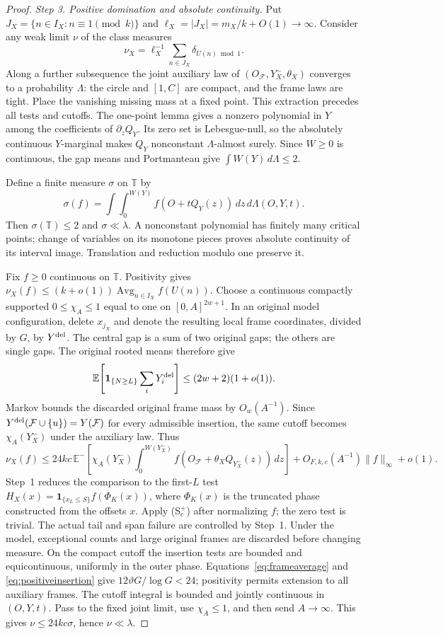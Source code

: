 \documentclass[11pt,a4paper]{article}
\newcommand{\E}{\mathbb E}
\newcommand{\ind}{\mathbf 1}
\DeclareMathOperator{\Avg}{Avg}
\begin{document}
\begin{proof}
\smallskip\noindent\emph{Step 3. Positive domination and absolute continuity.}
Put $J_X=\{n\in I_X:n\equiv1\pmod k\}$ and
$\ell_X=|J_X|=m_X/k+O(1)\to\infty$.
Consider any weak limit $\nu$ of the class measures
\[
                  \nu_X=\ell_X^{-1}\sum_{n\in J_X}\delta_{U(n)\bmod1}.
\]
Along a further subsequence the joint auxiliary law of
$(O_{\mathcal F},Y_X^-,\theta_X)$ converges to a probability $\Lambda$:
the circle and $[1,C]$ are compact, and the frame laws are tight.
Place the vanishing missing mass at a fixed point.
This extraction precedes all tests and cutoffs.
The one-point lemma gives a nonzero polynomial in $Y$ among the
coefficients of $\partial_zQ_Y$. Its zero set is Lebesgue-null, so the
absolutely continuous $Y$-marginal makes $Q_Y$ nonconstant
$\Lambda$-almost surely. Since $W\ge0$ is continuous, the gap means
and Portmanteau give $\int W(Y)\,d\Lambda\le2$.

Define a finite measure $\sigma$ on $\mathbb T$ by
\[
 \sigma(f)=\int\!\int_0^{W(Y)}
                 f(O+tQ_Y(z))\,dz\,d\Lambda(O,Y,t).
\]
Then $\sigma(\mathbb T)\le2$ and $\sigma\ll\lambda$.
A nonconstant polynomial has finitely many critical points;
change of variables on its monotone pieces proves absolute continuity
of its interval image. Translation and reduction modulo one preserve it.

Fix $f\ge0$ continuous on $\mathbb T$. Positivity gives
$\nu_X(f)\le(k+o(1))\Avg_{n\in I_X}f(U(n))$.
Choose a continuous compactly supported $0\le\chi_A\le1$ equal to one
on $[0,A]^{2w+1}$. In an original model configuration, delete $x_{j_X}$
and denote the resulting local frame coordinates, divided by $G$, by $Y^{\rm del}$.
The central gap is a sum of two original gaps; the others are single gaps.
The original rooted means therefore give
\[
 \E\!\left[\ind_{\{N\ge L\}}\sum_iY_i^{\rm del}\right]
                          \le(2w+2)(1+o(1)).
\]
Markov bounds the discarded original frame mass by $O_w(A^{-1})$.
Since $Y^{\rm del}(\mathcal F\cup\{u\})=Y(\mathcal F)$ for every admissible
insertion, the same cutoff becomes
$\chi_A(Y_X^-)$ under the auxiliary law. Thus
\[
 \nu_X(f)\le
 24kc\,\E^-\!\left[\chi_A(Y_X^-)
       \int_0^{W(Y_X^-)}
          f(O_{\mathcal F}+\theta_XQ_{Y_X^-}(z))\,dz\right]
       +O_{F,k,c}(A^{-1})\|f\|_\infty+o(1).
\]
Step~1 reduces the comparison to the first-$L$ test
$H_X(x)=\ind_{\{x_L\le S\}}f(\Phi_K(x))$, where $\Phi_K(x)$ is
the truncated phase constructed from the offsets $x$.
Apply (S$^+_c$) after normalizing $f$; the zero test is trivial.
The actual tail and span failure are controlled by Step~1.
Under the model, exceptional counts and large original frames are
discarded before changing measure. On the compact cutoff the
insertion tests are bounded and equicontinuous, uniformly in the outer phase.
Equations~\eqref{eq:frameaverage} and \eqref{eq:positiveinsertion}
give $12\vartheta G/\log G<24$; positivity permits extension to all
auxiliary frames. The cutoff integral is bounded and jointly continuous
in $(O,Y,t)$. Pass to the fixed joint limit, use $\chi_A\le1$, and then
send $A\to\infty$. This gives $\nu\le24kc\sigma$, hence $\nu\ll\lambda$.


\end{proof}
\end{document}
